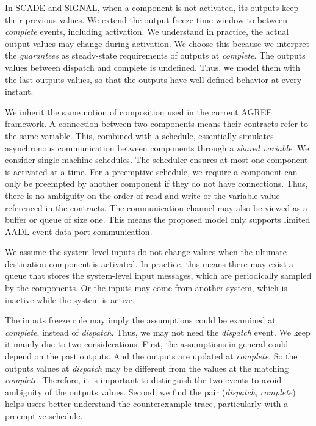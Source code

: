 In SCADE and SIGNAL, when a component is not activated, its outputs keep their previous values. We extend the output freeze time window to between \emph{complete} events, including activation. We understand in practice, the actual output values may change during activation. We choose this because we interpret the \emph{guarantees} as steady-state requirements of outputs at \emph{complete}. The outputs values between dispatch and complete is undefined. Thus, we model them with the last outputs values, so that the outputs have well-defined behavior at every instant.

We inherit the same notion of composition used in the current AGREE framework. A connection between two components means their contracts refer to the same variable. 
This, combined with a schedule, essentially simulates asynchronous communication between components through a \emph{shared variable}. 
We consider single-machine schedules. The scheduler ensures at most one component is activated at a time. For a preemptive schedule, we require a component can only be preempted by another component if they do not have connections. Thus, there is no ambiguity on the order of read and write or the variable value referenced in the contracts.
The communication channel may also be viewed as a buffer or queue of size one. %
This means the proposed model only supports limited AADL event data port communication.
 
We assume the system-level inputs do not change values when the ultimate destination component is activated. In practice, this means there may exist a queue that stores the system-level input messages, which are periodically sampled by the components. Or the inputs may come from another system, which is inactive while the system is active.

The inputs freeze rule may imply the assumptions could be examined at \emph{complete}, instead of \emph{dispatch}. Thus, we may not need the \emph{dispatch} event. We keep it mainly due to two considerations. First, the assumptions in general could depend on the past outputs. And the outputs are updated at \emph{complete}. So the outputs values at \emph{dispatch} may be different from the values at the matching \emph{complete}. Therefore, it is important to distinguish the two events to avoid ambiguity of the outputs values. Second, we find the pair (\emph{dispatch}, \emph{complete}) helps users better understand the counterexample trace, particularly with a preemptive schedule.

